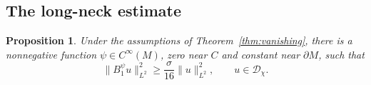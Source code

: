 \documentclass[12pt,reqno]{amsart}
\numberwithin{equation}{section}
\newtheorem{proposition}[theorem]{Proposition}
\theoremstyle{definition}
\begin{document}

\subsection{The long-neck estimate}

\begin{proposition}\label{prop:long-neck}
Under the assumptions of Theorem~\ref{thm:vanishing}, there is a
nonnegative function $\psi\in C^\infty(M)$, zero near $C$ and constant near
$\partial M$, such that
\begin{equation}\label{eq:gap}
 \|B_1^\psi u\|_{L^2}^2\geq\frac{\sigma}{16}\|u\|_{L^2}^2,
 \qquad u\in\mathcal D_\chi.
\end{equation}
\end{proposition}
\end{document}
